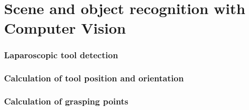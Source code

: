 \section{Scene and object recognition with Computer Vision}

\begin{frame}
\frametitle{Laparoscopic tool detection}
\end{frame}

\begin{frame}
\frametitle{Calculation of tool position and orientation}
\end{frame}

\begin{frame}
\frametitle{Calculation of grasping points}
\end{frame}
